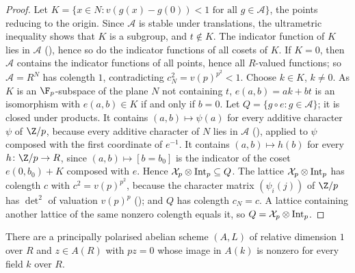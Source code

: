 \begin{proof}
Let $K=\{x\in N:v(g(x)-g(0))<1\text{ for all }g\in\mathcal A\}$, the points reducing to the origin. Since $\mathcal A$ is stable
under translations, the ultrametric inequality shows that $K$ is a subgroup, and $t\notin K$. The indicator function of $K$
lies in $\mathcal A$ (), hence so do the indicator
functions of all cosets of $K$. If $K=0$, then $\mathcal A$ contains the indicator functions of all points, hence all
$R$-valued functions; so $\mathcal A=R^N$ has colength $1$, contradicting $c_N^2=v(p)^{p^2}<1$. Choose $k\in K$, $k\ne0$. As
$K$ is an $\F_p$-subspace of the plane $N$ not containing $t$, $e(a,b)=ak+bt$ is an isomorphism with $e(a,b)\in K$ if and only
if $b=0$. Let $Q=\{g\circ e:g\in\mathcal A\}$; it is closed under products. It contains $(a,b)\mapsto\psi(a)$ for every additive
character $\psi$ of $\Z/p$, because every additive character of $N$ lies in $\mathcal A$
(), applied to $\psi$ composed with the first coordinate of
$e^{-1}$. It contains $(a,b)\mapsto h(b)$ for every $h\colon\Z/p\to R$, since $(a,b)\mapsto[b=b_0]$ is the indicator of the coset
$e(0,b_0)+K$ composed with $e$. Hence $\mathcal X_p\otimes\mathrm{Int}_p\subseteq Q$. The lattice $\mathcal X_p\otimes\mathrm{Int}_p$ has
colength $c$ with $c^2=v(p)^{p^2}$, because the character matrix $(\psi_i(j))$ of $\Z/p$ has $\det^2$ of valuation $v(p)^p$
(); and $Q$ has colength $c_N=c$. A lattice
containing another lattice of the same nonzero colength equals it, so $Q=\mathcal X_p\otimes\mathrm{Int}_p$.
\end{proof}

\begin{proposition}\label{pf:tower:ordpoint}
There are a principally polarised abelian scheme $(A,L)$ of relative dimension $1$ over $R$ and $z\in A(R)$ with
$pz=0$ whose image in $A(k)$ is nonzero for every field $k$ over $R$.
\end{proposition}

